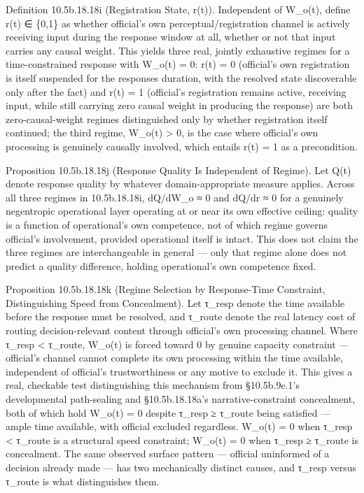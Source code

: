 \documentclass[
]{article}
\begin{document}
Definition 10.5b.18.18i (Registration State, r(t)). Independent of
W\_o(t), define r(t) ∈ \{0,1\} as whether official's own
perceptual/registration channel is actively receiving input during the
response window at all, whether or not that input carries any causal
weight. This yields three real, jointly exhaustive regimes for a
time-constrained response with W\_o(t) = 0: r(t) = 0 (official's own
registration is itself suspended for the responses duration, with the
resolved state discoverable only after the fact) and r(t) = 1
(official's registration remains active, receiving input, while still
carrying zero causal weight in producing the response) are both
zero-causal-weight regimes distinguished only by whether registration
itself continued; the third regime, W\_o(t) \textgreater{} 0, is the
case where official's own processing is genuinely causally involved,
which entails r(t) = 1 as a precondition.

Proposition 10.5b.18.18j (Response Quality Is Independent of Regime).
Let Q(t) denote response quality by whatever domain-appropriate measure
applies. Across all three regimes in 10.5b.18.18i, dQ/dW\_o ≈ 0 and
dQ/dr ≈ 0 for a genuinely negentropic operational layer operating at or
near its own effective ceiling: quality is a function of operational's
own competence, not of which regime governs official's involvement,
provided operational itself is intact. This does not claim the three
regimes are interchangeable in general --- only that regime alone does
not predict a quality difference, holding operational's own competence
fixed.

Proposition 10.5b.18.18k (Regime Selection by Response-Time Constraint,
Distinguishing Speed from Concealment). Let τ\_resp denote the time
available before the response must be resolved, and τ\_route denote the
real latency cost of routing decision-relevant content through
official's own processing channel. Where τ\_resp \textless{} τ\_route,
W\_o(t) is forced toward 0 by genuine capacity constraint --- official's
channel cannot complete its own processing within the time available,
independent of official's trustworthiness or any motive to exclude it.
This gives a real, checkable test distinguishing this mechanism from
§10.5b.9e.1's developmental path-sealing and §10.5b.18.18a's
narrative-constraint concealment, both of which hold W\_o(t) = 0 despite
τ\_resp ≥ τ\_route being satisfied --- ample time available, with
official excluded regardless. W\_o(t) = 0 when τ\_resp \textless{}
τ\_route is a structural speed constraint; W\_o(t) = 0 when τ\_resp ≥
τ\_route is concealment. The same observed surface pattern --- official
uninformed of a decision already made --- has two mechanically distinct
causes, and τ\_resp versus τ\_route is what distinguishes them.
\end{document}
